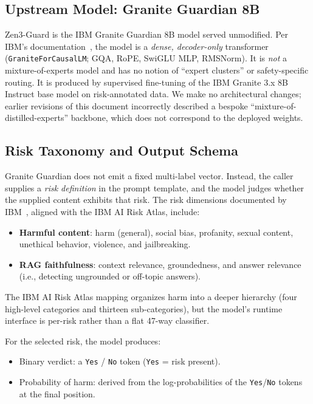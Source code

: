 \documentclass[11pt,a4paper]{article}
\begin{document}
\subsection{Upstream Model: Granite Guardian 8B}

Zen3-Guard is the IBM Granite Guardian 8B model served unmodified. Per IBM's
documentation~\cite{graniteguardian}, the model is a \emph{dense, decoder-only}
transformer (\texttt{GraniteForCausalLM}; GQA, RoPE, SwiGLU MLP, RMSNorm). It is
\emph{not} a mixture-of-experts model and has no notion of ``expert clusters'' or
safety-specific routing. It is produced by supervised fine-tuning of the IBM Granite 3.x
8B Instruct base model on risk-annotated data. We make no architectural changes; earlier
revisions of this document incorrectly described a bespoke ``mixture-of-distilled-experts''
backbone, which does not correspond to the deployed weights.

\subsection{Risk Taxonomy and Output Schema}

Granite Guardian does not emit a fixed multi-label vector. Instead, the caller supplies a
\emph{risk definition} in the prompt template, and the model judges whether the supplied
content exhibits that risk. The risk dimensions documented by IBM~\cite{graniteguardian},
aligned with the IBM AI Risk Atlas, include:

\begin{itemize}
\item \textbf{Harmful content}: harm (general), social bias, profanity, sexual content,
      unethical behavior, violence, and jailbreaking.
\item \textbf{RAG faithfulness}: context relevance, groundedness, and answer relevance
      (i.e., detecting ungrounded or off-topic answers).
\end{itemize}

The IBM AI Risk Atlas mapping organizes harm into a deeper hierarchy (four high-level
categories and thirteen sub-categories), but the model's runtime interface is per-risk
rather than a flat 47-way classifier.

For the selected risk, the model produces:
\begin{itemize}
\item Binary verdict: a \texttt{Yes} / \texttt{No} token (\texttt{Yes} = risk present).
\item Probability of harm: derived from the log-probabilities of the \texttt{Yes}/\texttt{No}
      tokens at the final position.
\end{itemize}
\end{document}
